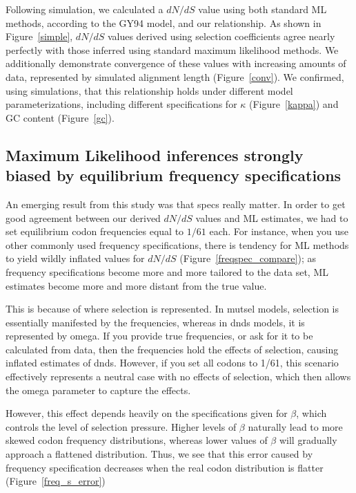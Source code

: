 \documentclass[11pt]{article}
\begin{document}
Following simulation, we calculated a $dN/dS$ value using both standard ML methods, according to the GY94 \cite{GoldmanYang1994} model, and our relationship. As shown in Figure~\ref{simple}, $dN/dS$ values derived using selection coefficients agree nearly perfectly with those inferred using standard maximum likelihood methods. We additionally demonstrate convergence of these values with increasing amounts of data, represented by simulated alignment length (Figure~\ref{conv}).
We confirmed, using simulations, that this relationship holds under different model parameterizations, including different specifications for $\kappa$ (Figure~\ref{kappa}) and GC content (Figure~\ref{gc}). 


\subsection*{Maximum Likelihood inferences strongly biased by equilibrium frequency specifications}

An emerging result from this study was that specs really matter. In order to get good agreement between our derived $dN/dS$ values and ML estimates, we had to set equilibrium codon frequencies equal to $1/61$ each. For instance, when you use other commonly used frequency specifications, there is tendency for ML methods to yield wildly inflated values for $dN/dS$ (Figure~\ref{freqspec_compare}); as frequency specifications become more and more tailored to the data set, ML estimates become more and more distant from the true value.

This is because of where selection is represented. In mutsel models, selection is essentially manifested by the frequencies, whereas in dnds models, it is represented by omega. If you provide true frequencies, or ask for it to be calculated from data, then the frequencies hold the effects of selection, causing inflated estimates of dnds. However, if you set all codons to 1/61, this scenario effectively represents a neutral case with no effects of selection, which then allows the omega parameter to capture the effects.

However, this effect depends heavily on the specifications given for $\beta$, which controls the level of selection pressure. Higher levels of $\beta$ naturally lead to more skewed codon frequency distributions, whereas lower values of $\beta$ will gradually approach a flattened distribution. Thus, we see that this error caused by frequency specification decreases when the real codon distribution is flatter (Figure~\ref{freq_s_error})
\end{document}
